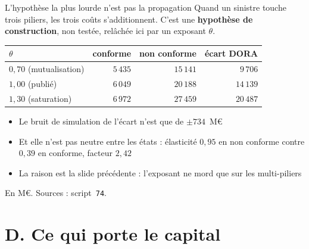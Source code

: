 \documentclass[11pt]{beamer}
\begin{document}
\begin{frame}{L'hypothèse la plus lourde n'est pas la propagation}
\small
Quand un sinistre touche trois piliers, les trois coûts s'additionnent. C'est une
\textbf{hypothèse de construction}, non testée, relâchée ici par un exposant $\theta$.
\vspace{1mm}

\begin{center}\small
\begin{tabular}{@{}l r r r@{}}
\toprule
$\theta$ & \textbf{conforme} & \textbf{non conforme} & \textbf{écart DORA} \\
\midrule
$0{,}70$ (mutualisation) & $5\,435$ & $15\,141$ & $9\,706$ \\
$1{,}00$ (publié) & $6\,049$ & $20\,188$ & $14\,139$ \\
$1{,}30$ (saturation) & $6\,972$ & $27\,459$ & $20\,487$ \\
\bottomrule
\end{tabular}
\end{center}
\vspace{2mm}

\begin{itemize}\itemsep4pt
  \item Le bruit de simulation de l'écart n'est que de $\pm 734$~M\euro
  \item \alert{Et elle n'est pas neutre entre les états} : élasticité $0{,}95$ en non conforme
        contre $0{,}39$ en conforme, facteur $2{,}42$
  \item La raison est la slide précédente : l'exposant ne mord que sur les multi-piliers
\end{itemize}
\vspace{1mm}
{\scriptsize En M\euro. Sources : script~\texttt{74}.}
\end{frame}

\section*{D. Ce qui porte le capital}
\end{document}
